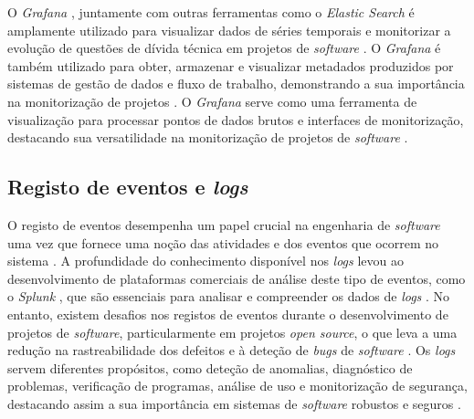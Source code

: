O \textit{Grafana} \cite{grafana}, juntamente com outras ferramentas como o \textit{Elastic Search}
\cite{elastic-search} é amplamente utilizado para visualizar dados de séries temporais e monitorizar
a evolução de questões de dívida técnica em projetos de \textit{software} \cite{metrics2019b}. O 
\textit{Grafana} é também utilizado para obter, armazenar e visualizar metadados produzidos por 
sistemas de gestão de dados e fluxo de trabalho, demonstrando a sua importância na monitorização 
de projetos \cite{metrics2021}. O \textit{Grafana} serve como uma ferramenta de visualização para 
processar pontos de dados brutos e interfaces de monitorização, destacando sua versatilidade na 
monitorização de projetos de \textit{software} \cite{metrics2022}.

\subsection{Registo de eventos e \textit{logs}}
\label{sec:logs}

O registo de eventos desempenha um papel crucial na engenharia de \textit{software} uma vez que 
fornece uma noção das atividades e dos eventos que ocorrem no sistema \cite{logs2022}. A profundidade 
do conhecimento disponível nos \textit{logs} levou ao desenvolvimento de plataformas comerciais de 
análise deste tipo de eventos, como o \textit{Splunk} \cite{splunk}, que são essenciais para 
analisar e compreender os dados de \textit{logs} \cite{logs2021}. No entanto, existem desafios nos 
registos de eventos durante o desenvolvimento de projetos de \textit{software}, particularmente em 
projetos \textit{open source}, o que leva a uma redução na rastreabilidade dos defeitos e à
deteção de \textit{bugs} de \textit{software} \cite{logs2018}. Os \textit{logs} servem diferentes 
propósitos, como deteção de anomalias, diagnóstico de problemas, verificação de programas, análise 
de uso e monitorização  de segurança, destacando assim a sua importância em sistemas de
\textit{software} robustos e seguros \cite{logs2019}.

